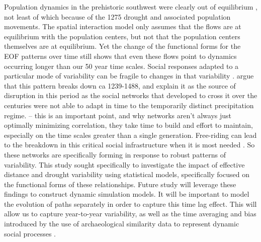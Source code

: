 \documentclass[10pt]{iopart}
\begin{document}
Population dynamics in the prehistoric southwest were clearly out of equilibrium \parencite{Hill2004}, not least of which because of the 1275 drought and associated population movements. The spatial interaction model only assumes that the flows are at equilibrium with the population centers, but not that the population centers themselves are at equilibrium. Yet the change of the functional forms for the EOF patterns over time still shows that even these flows point to dynamics occurring longer than our 50 year time scales. Social responses adapted to a particular mode of variability can be fragile to changes in that variability \parencite{Janssen2007}. \textcite{Cordell2007} argue that this pattern breaks down ca 1239-1488, and explain it as the source of disruption in this period as the social networks that developed to cross it over the centuries were not able to adapt in time to the temporarily distinct precipitation regime. -- this is an important point, and why networks aren't always just optimally minimizing correlation, they take time to build and effort to maintain, especially on the time scales greater than a single generation. Free-riding can lead to the breakdown in this critical social infrastructure when it is most needed \parencite{Kohler1996}. So these networks are specifically forming in response to robust patterns of variability. This study sought specifically to investigate the impact of effective distance and drought variability using statistical models, specifically focused on the functional forms of these relationships. Future study will leverage these findings to construct dynamic simulation models. It will be important to model the evolution of paths separately \parencite{Bevan2013} in order to capture this time lag effect. This will allow us to capture year-to-year variability, as well as the time averaging and bias introduced by the use of archaeological similarity data to represent dynamic social processes \parencite{Crema2014}.

\end{document}
